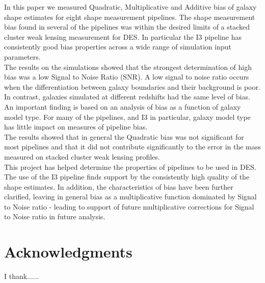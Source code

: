 \documentclass[useAMS,usenatbib]{mn2e}
\begin{document}
\indent In this paper we measured Quadratic, Multiplicative and
Additive bias of galaxy shape estimates for eight shape measurement
pipelines. The shape measurement bias found in several of the pipelines was within the
desired limits of a stacked cluster weak lensing measurement for
DES. In particular the I3 pipeline has consistently good bias properties
across a wide range of simulation input parameters.\\

\indent The results on the simulations showed that the strongest
determination of high bias was a low Signal to Noise Ratio (SNR). A
low signal to noise ratio occurs when the differentiation between
galaxy boundaries and their background is poor. In contrast, galaxies 
simulated at different redshifts had the same level of bias. An
important finding is based on an analysis of bias as a function of galaxy model
type. For many of the pipelines, and I3 in particular, galaxy
model type has little impact on measures of pipeline bias. \\

\indent The results showed that in general the Quadratic bias was not
significant for most pipelines and that it did not contribute
significantly to the error in the mass measured on stacked cluster
weak lensing profiles. \\

\indent This project has helped determine the properties of pipelines
to be used in DES. The use of the I3 pipeline
finds support by the consistently high quality of the shape
estimates. In addition, the characteristics of bias have been further
clarified, leaving in general bias as a multiplicative function
dominated by Signal to Noise ratio - leading to support of future
multiplicative corrections for Signal to Noise ratio in future
analysis. \\

 

 


\section*{Acknowledgments}
I thank......



\def\aj{AJ}                   %
\def\araa{\ref@jnl{ARA\&A}}             %
\def\apj{ApJ}                 %
\def\apjl{ApJ}                %
\def\aap{A\&A}                %
\def\aaps{A\&AS}              %
\def\mnras{MNRAS}             %
\def\prd{Phys.~Rev.~D}       %
\let\astap=\aap
\let\apjlett=\apjl
\let\apjsupp=\apjs
\let\applopt=\ao
\end{document}
